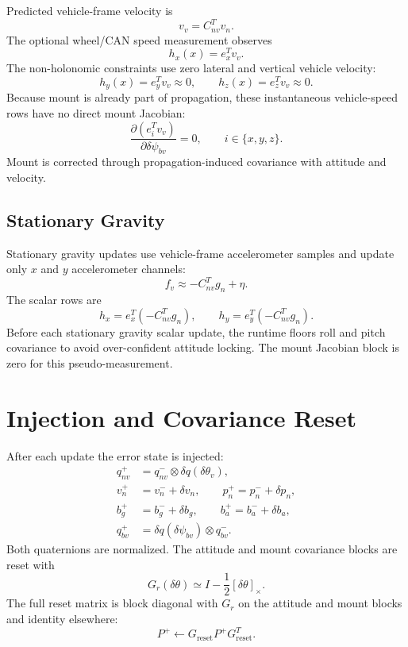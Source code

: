 \documentclass[11pt]{article}
\newcommand{\T}{^{T}}
\newcommand{\crossmat}[1]{\left[#1\right]_\times}
\newcommand{\dq}{\delta q}
\begin{document}
Predicted vehicle-frame velocity is
\begin{equation}
  v_v=C_{nv}\T v_n .
\end{equation}
The optional wheel/CAN speed measurement observes
\begin{equation}
  h_x(x)=e_x\T v_v .
\end{equation}
The non-holonomic constraints use zero lateral and vertical vehicle velocity:
\begin{equation}
  h_y(x)=e_y\T v_v\approx 0,\qquad
  h_z(x)=e_z\T v_v\approx 0 .
\end{equation}
Because mount is already part of propagation, these instantaneous vehicle-speed
rows have no direct mount Jacobian:
\begin{equation}
  \frac{\partial(e_i\T v_v)}{\partial\delta\psi_{bv}} = 0,\qquad i\in\{x,y,z\}.
\end{equation}
Mount is corrected through propagation-induced covariance with attitude and
velocity.

\subsection{Stationary Gravity}

Stationary gravity updates use vehicle-frame accelerometer samples and update
only \(x\) and \(y\) accelerometer channels:
\begin{equation}
  f_v \approx -C_{nv}\T g_n+\eta .
\end{equation}
The scalar rows are
\begin{equation}
  h_x=e_x\T(-C_{nv}\T g_n),\qquad
  h_y=e_y\T(-C_{nv}\T g_n).
\end{equation}
Before each stationary gravity scalar update, the runtime floors roll and pitch
covariance to avoid over-confident attitude locking. The mount Jacobian block
is zero for this pseudo-measurement.

\section{Injection and Covariance Reset}

After each update the error state is injected:
\begin{align}
  q_{nv}^{+} &= q_{nv}^{-}\otimes\dq(\delta\theta_v),\\
  v_n^{+} &= v_n^{-}+\delta v_n,\qquad
  p_n^{+}=p_n^{-}+\delta p_n,\\
  b_g^{+} &= b_g^{-}+\delta b_g,\qquad
  b_a^{+}=b_a^{-}+\delta b_a,\\
  q_{bv}^{+} &= \dq(\delta\psi_{bv})\otimes q_{bv}^{-}.
\end{align}
Both quaternions are normalized. The attitude and mount covariance
blocks are reset with
\begin{equation}
  G_r(\delta\theta)\simeq I-\frac{1}{2}\crossmat{\delta\theta}.
\end{equation}
The full reset matrix is block diagonal with \(G_r\) on the attitude and mount
blocks and identity elsewhere:
\begin{equation}
  P^{+}\leftarrow G_{\mathrm{reset}}P^{+}G_{\mathrm{reset}}\T .
\end{equation}
\end{document}
